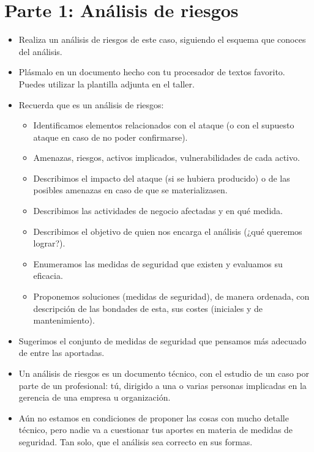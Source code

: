 \documentclass[a4paper]{article}
\begin{document}
\section{Parte 1: Análisis de riesgos}
\label{sec:org0000003}
\begin{itemize}
\item Realiza un análisis de riesgos de este caso, siguiendo el esquema que conoces del análisis.
\item Plásmalo en un documento hecho con tu procesador de textos favorito. Puedes utilizar la plantilla adjunta en el taller.
\item Recuerda que es un análisis de riesgos:

\begin{itemize}
\item Identificamos elementos relacionados con el ataque (o con el supuesto ataque en caso de no poder confirmarse).
\item Amenazas, riesgos, activos implicados, vulnerabilidades de cada activo.
\item Describimos el impacto del ataque (si se hubiera producido) o de las posibles amenazas en caso de que se materializasen.
\item Describimos las actividades de negocio afectadas y en qué medida.
\item Describimos el objetivo de quien nos encarga el análisis (¿qué queremos lograr?).
\item Enumeramos las medidas de seguridad que existen y evaluamos su eficacia.
\item Proponemos soluciones (medidas de seguridad), de manera ordenada, con descripción de las bondades de esta, sus costes (iniciales y de mantenimiento).
\end{itemize}
\item Sugerimos el conjunto de medidas de seguridad que pensamos más adecuado de entre las aportadas.
\item Un análisis de riesgos es un documento técnico, con el estudio de un caso por parte de un profesional: tú, dirigido a una o varias personas implicadas en la gerencia de una empresa u organización.
\item Aún no estamos en condiciones de proponer las cosas con mucho detalle técnico, pero nadie va a cuestionar tus aportes en materia de medidas de seguridad. Tan solo, que el análisis sea correcto en sus formas.
\end{itemize}
\end{document}
